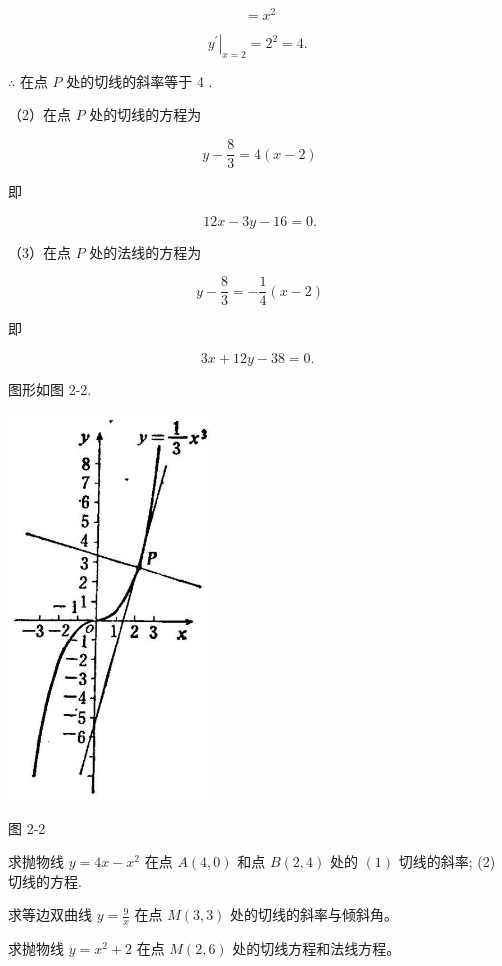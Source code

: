 \documentclass[lang=cn,newtx,12pt,scheme=chinese]{elegantbook}
\begin{document}
\[
= {x}^{2}
\]

\[
{\left. {y}^{\prime }\right| }_{x = 2} = {2}^{2} = 4\text{. }
\]

\(\therefore\) 在点 \(P\) 处的切线的斜率等于 4 .

（2）在点 \(P\) 处的切线的方程为

\[
y - \frac{8}{3} = 4\left( {x - 2}\right)
\]

即

\[
{12x} - {3y} - {16} = 0.
\]

（3）在点 \(P\) 处的法线的方程为

\[
y - \frac{8}{3} = - \frac{1}{4}\left( {x - 2}\right)
\]

即

\[
{3x} + {12y} - {38} = 0\text{. }
\]

图形如图 2-2.

\begin{center}
\includegraphics[max width=0.4\textwidth]{images/01912c18-5c3f-733d-b775-749ba9897a9d_65_242214.jpg}
\end{center}

图 2-2

\begin{problemset}[练习]

\item 求抛物线 \(y = {4x} - {x}^{2}\) 在点 \(A\left( {4,0}\right)\) 和点 \(B\left( {2,4}\right)\) 处的 \(\left( 1\right)\) 切线的斜率; (2) 切线的方程.

\item 求等边双曲线 \(y = \frac{9}{x}\) 在点 \(M\left( {3,3}\right)\) 处的切线的斜率与倾斜角。

\item 求抛物线 \(y = {x}^{2} + 2\) 在点 \(M\left( {2,6}\right)\) 处的切线方程和法线方程。

\end{problemset}
\end{document}
